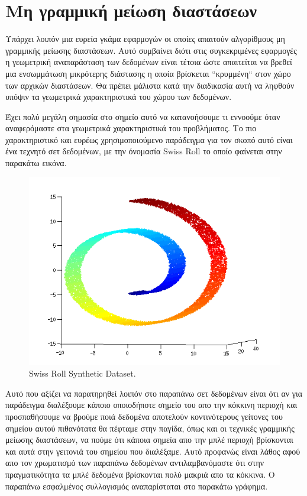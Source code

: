 \section{Μη γραμμική μείωση διαστάσεων}
\par
Υπάρχει λοιπόν μια ευρεία γκάμα εφαρμογών οι οποίες απαιτούν αλγορίθμους μη γραμμικής μείωσης διαστάσεων. Αυτό συμβαίνει διότι στις συγκεκριμένες εφαρμογές η γεωμετρική αναπαράσταση των δεδομένων είναι τέτοια ώστε απαιτείται να βρεθεί μια ενσωμμάτωση μικρότερης διάστασης η οποία βρίσκεται ``κρυμμένη`` στον χώρο των αρχικών διαστάσεων. Θα πρέπει μάλιστα κατά την διαδικασία αυτή να ληφθούν υπόψιν τα γεωμετρικά χαρακτηριστικά του χώρου των δεδομένων. 
\par
Έχει πολύ μεγάλη σημασία στο σημείο αυτό να κατανοήσουμε τι εννοούμε όταν αναφερόμαστε στα γεωμετρικά χαρακτηριστικά του προβλήματος. Το πιο χαρακτηριστικό και ευρέως χρησιμοποιούμενο παράδειγμα για τον σκοπό αυτό είναι ένα τεχνητό σετ δεδομένων, με την όνομασία \textlatin{Swiss Roll} το οποίο φαίνεται στην παρακάτω εικόνα. \\
\vspace{1.0cm}
\begin{figure}[h]
\centering
\includegraphics[scale=0.8]{figs/2.png}
\newline
\caption{ \textlatin{Swiss Roll Synthetic Dataset}.} 
\end{figure}
\vspace{1.0cm}
\par
Αυτό που αξίζει να παρατηρηθεί λοιπόν στο παραπάνω σετ δεδομένων είναι ότι αν για παράδειγμα διαλέξουμε κάποιο οποιοδήποτε σημείο του απο την κόκκινη περιοχή και προσπαθήσουμε να βρούμε ποιά δεδομένα αποτελούν κοντινότερους γείτονες του σημείου αυτού πιθανότατα θα πέφταμε στην παγίδα, όπως και οι τεχνικές γραμμικής μείωσης διαστάσεων, να πούμε ότι κάποια σημεία απο την μπλέ περιοχή βρίσκονται και αυτά στην γειτονιά του σημείου που διαλέξαμε. Αυτό προφανώς είναι λάθος αφού απο τον χρωματισμό των παραπάνω δεδομένων αντιλαμβανόμαστε ότι στην πραγματικότητα τα μπλέ δεδομένα βρίσκονται πολύ μακριά απο τα κόκκινα. Ο παραπάνω εσφαλμένος συλλογισμός αναπαρίσταται στο παρακάτω γράφημα.
